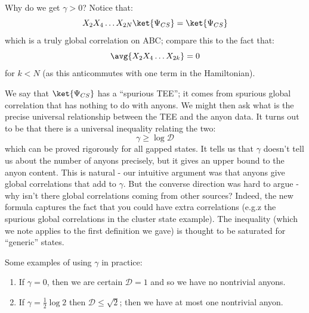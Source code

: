Why do we get $\gamma > 0$? Notice that:
\begin{equation}
    X_2X_4\ldots X_{2N}\ket{\Psi_{CS}} = \ket{\Psi_{CS}}
\end{equation}
which is a truly global correlation on ABC; compare this to the fact that:
\begin{equation}
    \avg{X_2X_4\ldots X_{2k}} = 0
\end{equation}
for $k < N$ (as this anticommutes with one term in the Hamiltonian).

We say that $\ket{\Psi_{CS}}$ has a ``spurious TEE''; it comes from spurious global correlation that has nothing to do with anyons. We might then ask what is the precise universal relationship between the TEE and the anyon data. It turns out to be that there is a universal inequality relating the two:
\begin{equation}
    \boxed{\gamma \geq \log \mathcal{D}}
\end{equation}
which can be proved rigorously for all gapped states. It tells us that $\gamma$ doesn't tell us about the number of anyons precisely, but it gives an upper bound to the anyon content. This is natural - our intuitive argument was that anyons give global correlations that add to $\gamma$. But the converse direction was hard to argue - why isn't there global correlations coming from other sources? Indeed, the new formula captures the fact that you could have extra correlations (e.g.z the spurious global correlations in the cluster state example). The inequality (which we note applies to the first definition we gave) is thought to be saturated for ``generic'' states.

Some examples of using $\gamma$ in practice:
\begin{enumerate}
    \item If $\gamma = 0$, then we are certain $\mathcal{D} = 1$ and so we have no nontrivial anyons.
    \item If $\gamma = \frac{1}{2}\log 2$ then $\mathcal{D} \leq \sqrt{2}$; then we have at most one nontrivial anyon.
\end{enumerate}